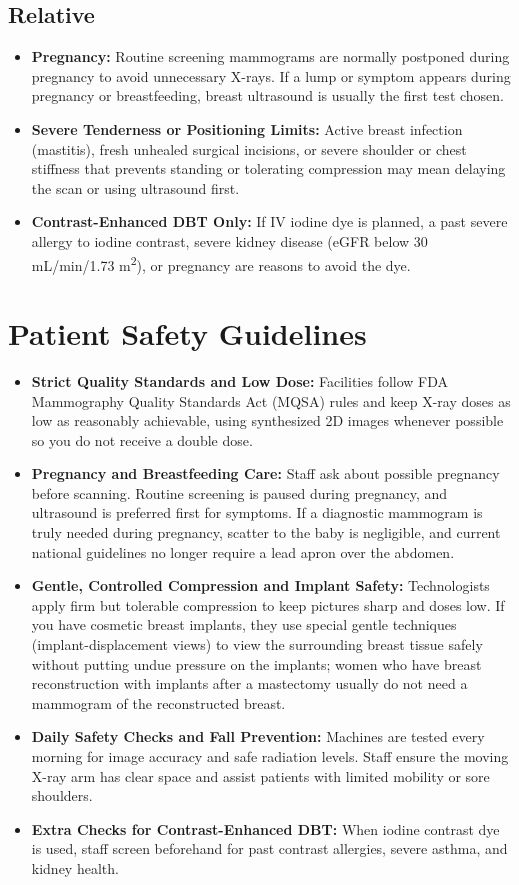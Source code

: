 \subsection{Relative}
\begin{itemize}
\item \textbf{Pregnancy:} Routine screening mammograms are normally postponed during pregnancy to avoid unnecessary X-rays. If a lump or symptom appears during pregnancy or breastfeeding, breast ultrasound is usually the first test chosen.
\item \textbf{Severe Tenderness or Positioning Limits:} Active breast infection (mastitis), fresh unhealed surgical incisions, or severe shoulder or chest stiffness that prevents standing or tolerating compression may mean delaying the scan or using ultrasound first.
\item \textbf{Contrast-Enhanced DBT Only:} If IV iodine dye is planned, a past severe allergy to iodine contrast, severe kidney disease (eGFR below 30 mL/min/1.73 m\textsuperscript{2}), or pregnancy are reasons to avoid the dye.
\end{itemize}

\section{Patient Safety Guidelines}
\begin{itemize}
\item \textbf{Strict Quality Standards and Low Dose:} Facilities follow FDA Mammography Quality Standards Act (MQSA) rules and keep X-ray doses as low as reasonably achievable, using synthesized 2D images whenever possible so you do not receive a double dose.
\item \textbf{Pregnancy and Breastfeeding Care:} Staff ask about possible pregnancy before scanning. Routine screening is paused during pregnancy, and ultrasound is preferred first for symptoms. If a diagnostic mammogram is truly needed during pregnancy, scatter to the baby is negligible, and current national guidelines no longer require a lead apron over the abdomen.
\item \textbf{Gentle, Controlled Compression and Implant Safety:} Technologists apply firm but tolerable compression to keep pictures sharp and doses low. If you have cosmetic breast implants, they use special gentle techniques (implant-displacement views) to view the surrounding breast tissue safely without putting undue pressure on the implants; women who have breast reconstruction with implants after a mastectomy usually do not need a mammogram of the reconstructed breast.
\item \textbf{Daily Safety Checks and Fall Prevention:} Machines are tested every morning for image accuracy and safe radiation levels. Staff ensure the moving X-ray arm has clear space and assist patients with limited mobility or sore shoulders.
\item \textbf{Extra Checks for Contrast-Enhanced DBT:} When iodine contrast dye is used, staff screen beforehand for past contrast allergies, severe asthma, and kidney health.
\end{itemize}

